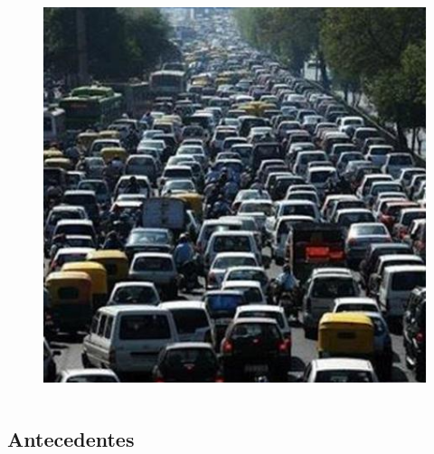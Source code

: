 \begin{frame}
\begin{columns}[T]
\begin{column}{.40\textwidth}
                     \begin{figure}[htbp]
                                \centering
                                \includegraphics[width=1\textwidth]{diagramas/motivacion.png}
                        \end{figure}

               \end{column}
      \end{columns}
	\end{frame}

\subsection{Antecedentes}

